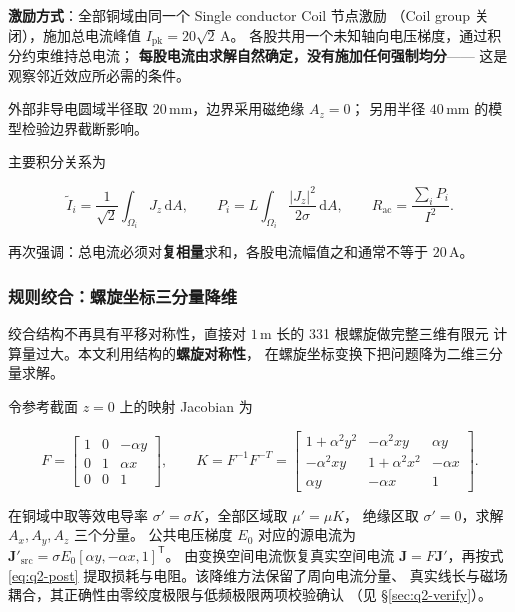 \documentclass[12pt, a4paper]{ctexart}
\newcommand{\Rac}{R_{\mathrm{ac}}}
\newcommand{\U}[1]{\ensuremath{\,\mathrm{#1}}}
\begin{document}
\textbf{激励方式}：全部铜域由同一个 Single conductor Coil 节点激励
（Coil group 关闭），施加总电流峰值 $I_{\mathrm{pk}} = 20\sqrt{2}\U{A}$。
各股共用一个未知轴向电压梯度，通过积分约束维持总电流；
\textbf{每股电流由求解自然确定，没有施加任何强制均分}——
这是观察邻近效应所必需的条件。

外部非导电圆域半径取 $20\U{mm}$，边界采用磁绝缘 $A_z = 0$；
另用半径 $40\U{mm}$ 的模型检验边界截断影响。

主要积分关系为

\begin{equation}
\tilde I_i = \frac{1}{\sqrt2}\int_{\Omega_i} J_z\,\mathrm{d}A,
\qquad
P_i = L\int_{\Omega_i}\frac{|J_z|^2}{2\sigma}\,\mathrm{d}A,
\qquad
\Rac = \frac{\sum_i P_i}{I^2}.
\label{eq:q2-post}
\end{equation}

再次强调：总电流必须对\textbf{复相量}求和，各股电流幅值之和通常不等于 $20\U{A}$。

\subsubsection{规则绞合：螺旋坐标三分量降维}

绞合结构不再具有平移对称性，直接对 $1\U{m}$ 长的 331 根螺旋做完整三维有限元
计算量过大。本文利用结构的\textbf{螺旋对称性}，
在螺旋坐标变换下把问题降为二维三分量求解。

令参考截面 $z=0$ 上的映射 Jacobian 为

\begin{equation}
F = \begin{bmatrix}
1 & 0 & -\alpha y \\
0 & 1 & \alpha x \\
0 & 0 & 1
\end{bmatrix},
\qquad
K = F^{-1}F^{-T} =
\begin{bmatrix}
1+\alpha^2y^2 & -\alpha^2xy & \alpha y \\
-\alpha^2xy & 1+\alpha^2x^2 & -\alpha x \\
\alpha y & -\alpha x & 1
\end{bmatrix}.
\end{equation}

在铜域中取等效电导率 $\sigma' = \sigma K$，全部区域取 $\mu' = \mu K$，
绝缘区取 $\sigma' = 0$，求解 $A_x, A_y, A_z$ 三个分量。
公共电压梯度 $E_0$ 对应的源电流为
$\mathbf J'_{\mathrm{src}} = \sigma E_0[\alpha y, -\alpha x, 1]^{\mathsf T}$。
由变换空间电流恢复真实空间电流 $\mathbf J = F\mathbf J'$，再按式
\eqref{eq:q2-post} 提取损耗与电阻。该降维方法保留了周向电流分量、
真实线长与磁场耦合，其正确性由零绞度极限与低频极限两项校验确认
（见 \S\ref{sec:q2-verify}）。
\end{document}
